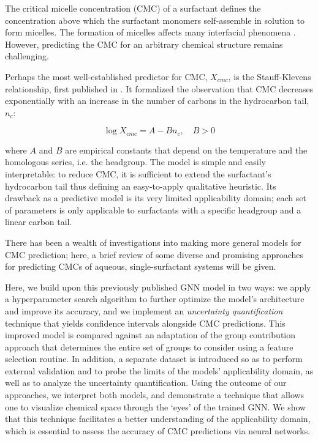 The critical micelle concentration (CMC) of a surfactant defines the
concentration above which the surfactant monomers self-assemble in solution to
form micelles. The formation of micelles affects many interfacial phenomena
\cite{rosenSurfactantsInterfacialPhenomena2012}. However, predicting the CMC for
an arbitrary chemical structure remains challenging.

Perhaps the most well-established predictor for CMC, $X_{cmc}$, is the
Stauff-Klevens relationship, first published in
\citeyear{klevensStructureAggregationDilate1953}
\cite{klevensStructureAggregationDilate1953}. It formalized the observation that
CMC decreases exponentially with an increase in the number of carbons in the
hydrocarbon tail, $n_c$:

\begin{equation}
    \label{eq:klevens}
    \log X_{cmc} = A - Bn_c, \quad B > 0
\end{equation}

where $A$ and $B$ are empirical constants that depend on the temperature and the
homologous series, i.e. the headgroup. The model is simple and easily
interpretable: to reduce CMC, it is sufficient to extend the surfactant's
hydrocarbon tail thus defining an easy-to-apply qualitative heuristic. Its
drawback as a predictive model is its very limited applicability domain; each
set of parameters is only applicable to surfactants with a specific headgroup
and a linear carbon tail.

There has been a wealth of investigations into making more general models for
CMC prediction; here, a brief review of some diverse and promising approaches
for predicting CMCs of aqueous, single-surfactant systems will be given.



Here, we build upon this previously published GNN model
\cite{qinPredictingCriticalMicelle2021} in two ways: we apply a hyperparameter
search algorithm to further optimize the model's architecture and improve its
accuracy, and we implement an \emph{uncertainty quantification} technique that
yields confidence intervals alongside CMC predictions. This improved model is
compared against an adaptation of the group contribution approach that
determines the entire set of groups to consider using a feature selection
routine. In addition, a separate dataset is introduced so as to perform external
validation and to probe the limits of the models' applicability domain, as well
as to analyze the uncertainty quantification. Using the outcome of our
approaches, we interpret both models, and demonstrate a technique that allows
one to visualize chemical space through the `eyes' of the trained GNN. We show
that this technique facilitates a better understanding of the applicability
domain, which is essential to assess the accuracy of CMC predictions via neural
networks.